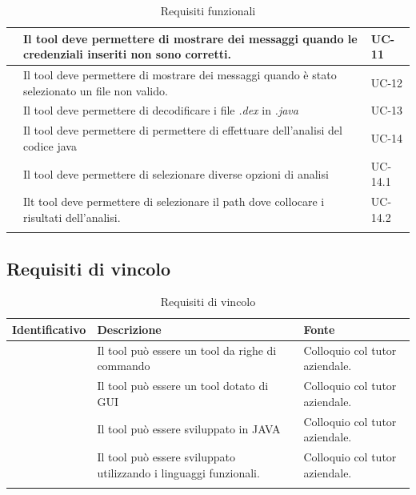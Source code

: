 \begin{center}
\begin{longtable}{ | c| C{7cm} |C{3cm} |}
        & Il tool deve permettere di mostrare dei messaggi quando le credenziali inseriti non sono corretti.& UC-11 \\\hline
        & Il tool deve permettere di mostrare dei messaggi quando è stato selezionato un file non valido.& UC-12 \\\hline
        & Il tool deve permettere di decodificare i file \textit{.dex} in \textit{.java} & UC-13\\\hline
        & Il tool deve permettere di permettere di effettuare dell'analisi del codice java& UC-14 \\\hline
        & Il tool deve permettere di selezionare diverse opzioni di analisi &UC-14.1 \\\hline
        & Ilt tool deve permettere di selezionare il path dove collocare i risultati dell'analisi.& UC-14.2\\\hline

        \caption{Requisiti funzionali}
    \end{longtable}
\end{center}
\setcounter{rowcount}{0}

\subsection{Requisiti di vincolo}\label{subsec:requisiti-vincolo}
\renewcommand{\arraystretch}{1.5}
\begin{center}
    \begin{longtable}{ | c| C{7cm} |C{3cm} |}
        \hline
        \textbf{Identificativo} & \textbf{Descrizione} &\textbf{Fonte}\\\hline
         &Il tool può essere un tool da righe di commando & Colloquio col tutor aziendale.\\\hline
         &Il tool può essere un tool dotato di GUI & Colloquio col tutor aziendale.\\\hline
         &Il tool può essere sviluppato in JAVA & Colloquio col tutor aziendale.\\\hline
         &Il tool può essere sviluppato utilizzando i linguaggi funzionali.& Colloquio col tutor aziendale.\\\hline
        \caption{Requisiti di vincolo}
    \end{longtable}
\end{center}
\setcounter{rowcount}{0}


